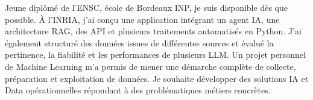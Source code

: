 
\begin{cvparagraph}
Jeune diplômé de l’ENSC, école de Bordeaux INP, je suis disponible dès que possible. À l’INRIA, j’ai conçu une application intégrant un agent IA, une architecture RAG, des API et plusieurs traitements automatisés en Python. J’ai également structuré des données issues de différentes sources et évalué la pertinence, la fiabilité et les performances de plusieurs LLM. Un projet personnel de Machine Learning m’a permis de mener une démarche complète de collecte, préparation et exploitation de données. Je souhaite développer des solutions IA et Data opérationnelles répondant à des problématiques métiers concrètes.
\end{cvparagraph}
